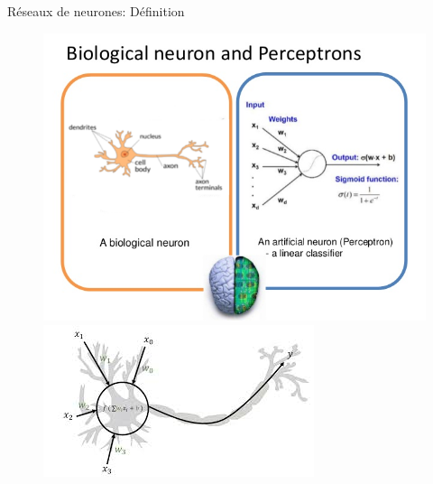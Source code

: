 \documentclass{beamer}
\begin{document}
\begin{frame}{Réseaux de neurones: Définition}
	\begin{figure}[h]
		\centering
		\begin{minipage}{0.5\textwidth}
			\centering
			\includegraphics[width=\linewidth]{brain.png}
			\caption{}
		\end{minipage}\hfill
		\begin{minipage}{0.5\textwidth}
			\centering
			\includegraphics[width=\linewidth]{RNN-BIO-Math.jpeg}
			\caption{}
		\end{minipage}
	\end{figure}
\end{frame}	
\end{document}
